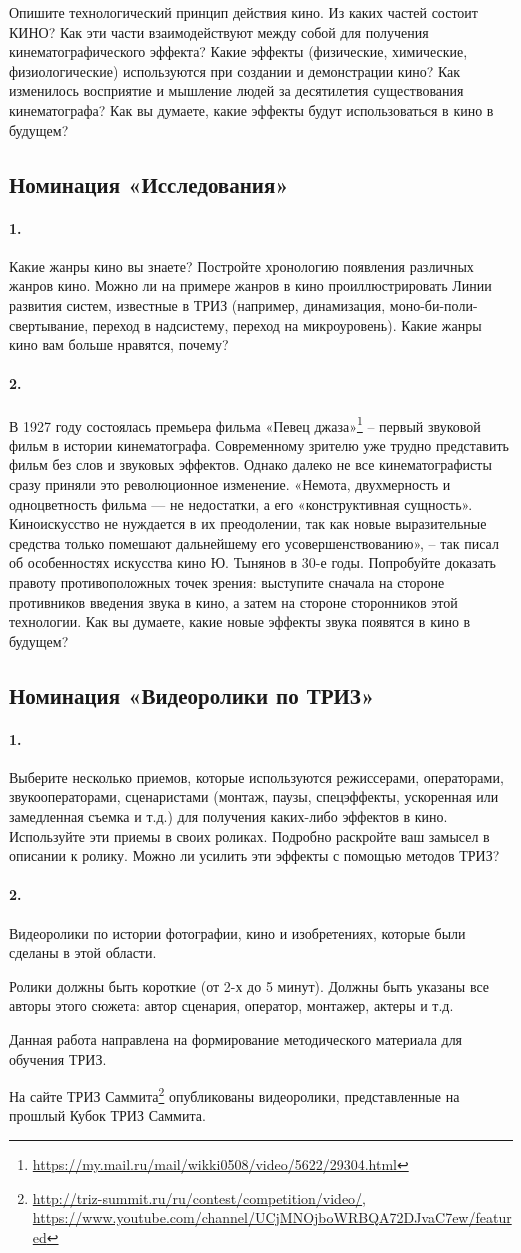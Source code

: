 \documentclass[11pt,a4paper]{article}
\newcommand{\video}{Ролики должны быть короткие (от 2-х до 5 минут). Должны
  быть указаны все авторы этого сюжета: автор сценария, оператор, монтажер,
  актеры и т.д.

Данная работа направлена на формирование методического материала для обучения
ТРИЗ.

На сайте ТРИЗ
Саммита\footnote{\url{http://triz-summit.ru/ru/contest/competition/video/},\\
  \url{https://www.youtube.com/channel/UCjMNOjboWRBQA72DJvaC7ew/featured}}
опубликованы видеоролики, представленные на прошлый Кубок ТРИЗ Саммита.}
\newcommand{\kinotools}{\paragraph{1.}
Выберите несколько приемов, которые используются режиссерами, операторами,
звукооператорами, сценаристами (монтаж, паузы, спецэффекты, ускоренная или
замедленная съемка и т.д.) для получения каких-либо эффектов в кино.
Используйте эти приемы в своих роликах. Подробно раскройте ваш замысел в
описании к ролику. Можно ли усилить эти эффекты с помощью методов ТРИЗ?

\paragraph{2.}
Видеоролики по истории фотографии, кино и изобретениях, которые были сделаны в
этой области.
}
\begin{document}
Опишите технологический принцип действия кино. Из каких частей состоит КИНО?
Как эти части взаимодействуют между собой для получения кинематографического
эффекта? Какие эффекты (физические, химические, физиологические) используются
при создании и демонстрации кино? Как изменилось восприятие и мышление людей
за десятилетия существования кинематографа? Как вы думаете, какие эффекты
будут использоваться в кино в будущем?

\subsection*{Номинация «Исследования»}

\paragraph{1.}
Какие жанры кино вы знаете? Постройте хронологию появления различных жанров
кино. Можно ли на примере жанров в кино проиллюстрировать Линии развития
систем, известные в ТРИЗ (например, динамизация, моно-би-поли-свертывание,
переход в надсистему, переход на микроуровень). Какие жанры кино вам больше
нравятся, почему?

\paragraph{2.}
В 1927 году состоялась премьера фильма «Певец
джаза»\footnote{\url{https://my.mail.ru/mail/wikki0508/video/5622/29304.html}}
-- первый звуковой фильм в истории кинематографа. Современному зрителю уже
трудно представить фильм без слов и звуковых эффектов. Однако далеко не все
кинематографисты сразу приняли это революционное изменение. «Немота,
двухмерность и одноцветность фильма — не недостатки, а его «конструктивная
сущность». Киноискусство не нуждается в их преодолении, так как новые
выразительные средства только помешают дальнейшему его усовершенствованию», --
так писал об особенностях искусства кино Ю. Тынянов в 30-е годы. Попробуйте
доказать правоту противоположных точек зрения: выступите сначала на стороне
противников введения звука в кино, а затем на стороне сторонников этой
технологии.  Как вы думаете, какие новые эффекты звука появятся в кино в
будущем?

\subsection*{Номинация «Видеоролики по ТРИЗ»}
\kinotools

\video
\clearpage
\end{document}
